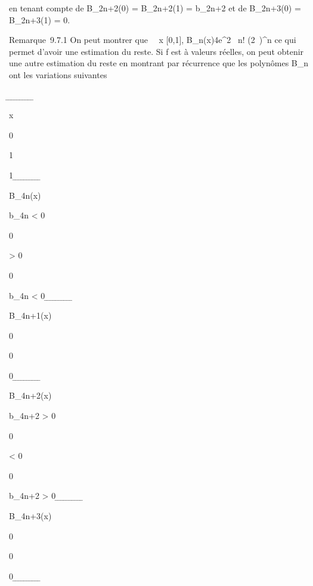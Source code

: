 \documentclass[]{article}
\begin{document}
en tenant compte de B\_2n+2(0) = B\_2n+2(1) =
b\_2n+2 et de B\_2n+3(0) = B\_2n+3(1) = 0.

Remarque~9.7.1 On peut montrer que \forall~~x \in
{[}0,1{]}, \textbar{}B\_n(x)\textbar{}\leq 4e^2\pi~ n!
\over (2\pi~)^n ce qui permet d'avoir une
estimation du reste. Si f est à valeurs réelles, on peut obtenir une
autre estimation du reste en montrant par récurrence que les polynômes
B\_n ont les variations suivantes

̲ ̲ ̲ ̲ ̲ ̲ ̲ ̲ ̲ ̲

x

0

1

1 ̲ ̲ ̲ ̲ ̲ ̲ ̲ ̲ ̲ ̲

B\_4n(x)

b\_4n \textless{} 0

\nearrow

0

\nearrow

\textgreater{} 0

\searrow

0

\searrow

b\_4n \textless{} 0 ̲ ̲ ̲ ̲ ̲ ̲ ̲ ̲ ̲ ̲

B\_4n+1(x)

0

\searrow

\nearrow

0

\nearrow

\searrow

0 ̲ ̲ ̲ ̲ ̲ ̲ ̲ ̲ ̲ ̲

B\_4n+2(x)

b\_4n+2 \textgreater{} 0

\searrow

0

\searrow

\textless{} 0

\nearrow

0

\nearrow

b\_4n+2 \textgreater{} 0 ̲ ̲ ̲ ̲ ̲ ̲ ̲ ̲ ̲ ̲

B\_4n+3(x)

0

\nearrow

\searrow

0

\searrow

\nearrow

0 ̲ ̲ ̲ ̲ ̲ ̲ ̲ ̲ ̲ ̲
\end{document}
